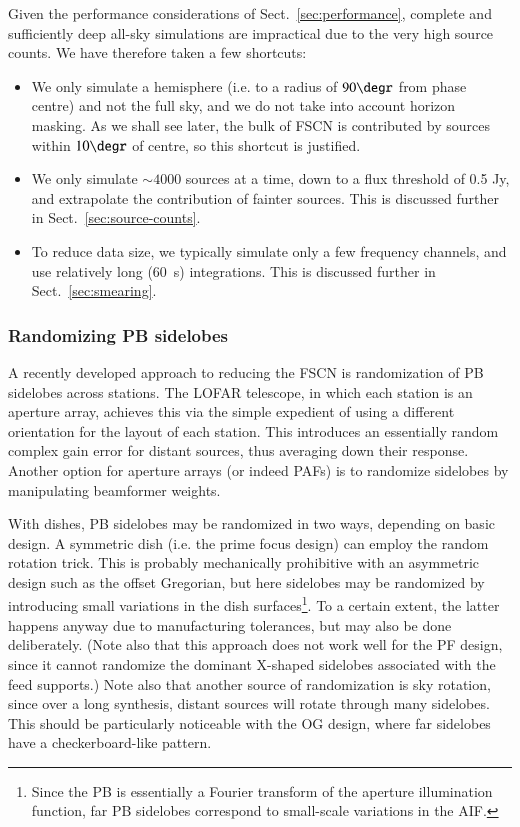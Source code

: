 \documentclass{aa}
\begin{document}
Given the performance considerations of Sect.~\ref{sec:performance}, complete and sufficiently deep all-sky simulations are impractical due to the very high source counts. We have therefore taken a few shortcuts:

\begin{itemize}
  \item We only simulate a hemisphere (i.e. to a radius of $90\degr$ from phase centre) and not the full sky, and we do not take into account horizon masking. As we shall see later, the bulk of FSCN is contributed by sources within $10\degr$ of centre, so this shortcut is justified.
  \item We only simulate $\sim4000$ sources at a time, down to a flux threshold of 0.5 Jy, and extrapolate the contribution of fainter sources. This is discussed further in Sect.~\ref{sec:source-counts}.
  \item To reduce data size, we typically simulate only a few frequency channels, and use relatively long (60~s) integrations. This is discussed further in Sect.~\ref{sec:smearing}.
\end{itemize}

\subsubsection{Randomizing PB sidelobes}
\label{sec:randomizing}

A recently developed approach to reducing the FSCN is randomization of PB sidelobes across stations. The LOFAR telescope, in which each station is an aperture array, achieves this via the simple expedient of using a different orientation for the layout of each station. This introduces an essentially random complex gain error for distant sources, thus averaging down their response. Another option for aperture arrays (or indeed PAFs) is to randomize sidelobes by manipulating beamformer weights.

With dishes, PB sidelobes may be randomized in two ways, depending on basic design. A symmetric dish (i.e. the prime focus design) can employ the random rotation trick. This is probably mechanically prohibitive with an asymmetric design such as the offset Gregorian, but here sidelobes may be randomized by introducing small variations in the dish surfaces\footnote{Since the PB is essentially a Fourier transform of the aperture illumination function, far PB sidelobes correspond to small-scale variations in the AIF.}. To a certain extent, the latter happens anyway due to manufacturing tolerances, but may also be done deliberately. (Note also that this approach does not work well for the PF design, since it cannot randomize the dominant X-shaped sidelobes associated with the feed supports.) Note also that another source of randomization is sky rotation, since over a long synthesis, distant sources will rotate through many sidelobes. This should be particularly noticeable with the OG design, where far sidelobes have a checkerboard-like pattern.
\end{document}
